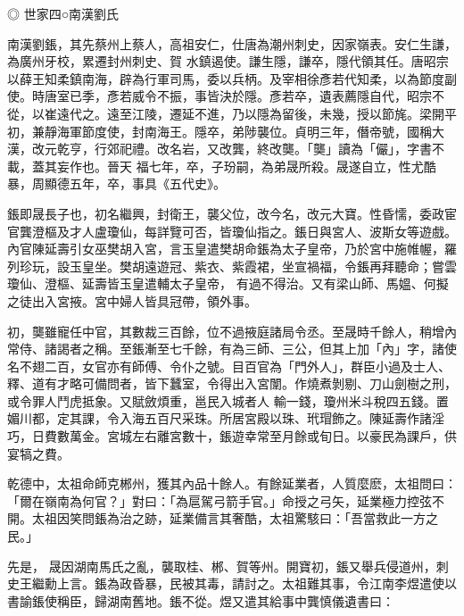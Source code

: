 
\begin{pinyinscope}

 ◎
 世家四○南漢劉氏



 南漢劉鋹，其先蔡州上蔡人，高祖安仁，仕唐為潮州刺史，因家嶺表。安仁生謙，為廣州牙校，累遷封州刺史、賀
 水鎮遏使。謙生隱，謙卒，隱代領其任。唐昭宗以薛王知柔鎮南海，辟為行軍司馬，委以兵柄。及宰相徐彥若代知柔，以為節度副使。時唐室已季，彥若威令不振，事皆決於隱。彥若卒，遺表薦隱自代，昭宗不從，以崔遠代之。遠至江陵，遷延不進，乃以隱為留後，未幾，授以節旄。梁開平初，兼靜海軍節度使，封南海王。隱卒，弟陟襲位。貞明三年，僭帝號，國稱大漢，改元乾亨，行郊祀禮。改名岩，又改龔，終改龑。「龑」讀為「儼」，字書不載，蓋其妄作也。晉天
 福七年，卒，子玢嗣，為弟晟所殺。晟遂自立，性尤酷暴，周顯德五年，卒，事具《五代史》。



 鋹即晟長子也，初名繼興，封衛王，襲父位，改今名，改元大寶。性昏懦，委政宦官龔澄樞及才人盧瓊仙，每詳覽可否，皆瓊仙指之。鋹日與宮人、波斯女等遊戲。內官陳延壽引女巫樊胡入宮，言玉皇遣樊胡命鋹為太子皇帝，乃於宮中施帷幄，羅列珍玩，設玉皇坐。樊胡遠遊冠、紫衣、紫霞裙，坐宣禍福，令鋹再拜聽命；嘗雲瓊仙、澄樞、延壽皆玉皇遣輔太子皇帝，
 有過不得治。又有梁山師、馬媼、何擬之徒出入宮掖。宮中婦人皆具冠帶，領外事。



 初，龑雖寵任中官，其數裁三百餘，位不過掖庭諸局令丞。至晟時千餘人，稍增內常侍、諸謁者之稱。至鋹漸至七千餘，有為三師、三公，但其上加「內」字，諸使名不翅二百，女官亦有師傅、令仆之號。目百官為「門外人」，群臣小過及士人、釋、道有才略可備問者，皆下蠶室，令得出入宮闈。作燒煮剝剔、刀山劍樹之刑，或令罪人鬥虎抵象。又賦斂煩重，邕民入城者人
 輸一錢，瓊州米斗稅四五錢。置媚川都，定其課，令入海五百尺采珠。所居宮殿以珠、玳瑁飾之。陳延壽作諸淫巧，日費數萬金。宮城左右離宮數十，鋹遊幸常至月餘或旬日。以豪民為課戶，供宴犒之費。



 乾德中，太祖命師克郴州，獲其內品十餘人。有餘延業者，人質麼麽，太祖問曰：「爾在嶺南為何官？」對曰：「為扈駕弓箭手官。」命授之弓矢，延業極力控弦不開。太祖因笑問鋹為治之跡，延業備言其奢酷，太祖驚駭曰：「吾當救此一方之民。」



 先是，
 晟因湖南馬氏之亂，襲取桂、郴、賀等州。開寶初，鋹又舉兵侵道州，刺史王繼勳上言。鋹為政昏暴，民被其毒，請討之。太祖難其事，令江南李煜遣使以書諭鋹使稱臣，歸湖南舊地。鋹不從。煜又遣其給事中龔慎儀遺書曰：




\end{pinyinscope}
